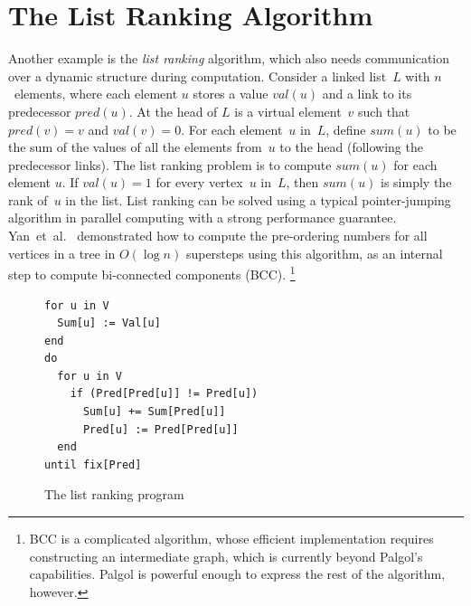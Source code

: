 \documentclass{sokendai_thesis} %
\begin{document}
\section{The List Ranking Algorithm}
\label{sec:list-ranking}

Another example is the \emph{list ranking} algorithm, which also needs communication over a dynamic structure during computation.
Consider a linked list~$L$ with $n$~elements, where each element $u$ stores a value $\mathit{val}(u)$ and a link to its predecessor $\mathit{pred}(u)$.
At the head of $L$ is a virtual element~$v$ such that $\mathit{pred}(v)=v$ and $\mathit{val}(v)=0$.
For each element~$u$ in~$L$, define $\mathit{sum}(u)$ to be the sum of the values of all the elements from~$u$ to the head (following the predecessor links).
The list ranking problem is to compute $\mathit{sum}(u)$ for each element $u$.
If $\mathit{val}(u)=1$ for every vertex~$u$ in~$L$, then $\mathit{sum}(u)$ is simply the rank of~$u$ in the list.
List ranking can be solved using a typical pointer-jumping algorithm in parallel computing with a strong performance guarantee.
Yan~et~al.~\cite{connectivity} demonstrated how to compute the pre-ordering numbers for all vertices in a tree in $O(\log n)$ supersteps using this algorithm, as an internal step to compute bi-connected components (BCC).%
\footnote{BCC is a complicated algorithm, whose efficient implementation requires constructing an intermediate graph, which is currently beyond Palgol's capabilities. Palgol is powerful enough to express the rest of the algorithm, however.}

\begin{figure}[t]
\begin{lstlisting}[basicstyle=\small\ttfamily]
for u in V
  Sum[u] := Val[u]
end
do
  for u in V
    if (Pred[Pred[u]] != Pred[u])
      Sum[u] += Sum[Pred[u]]
      Pred[u] := Pred[Pred[u]]
  end 
until fix[Pred]
\end{lstlisting}
\vspace{-2ex}
\caption{The list ranking program}
\label{fig:ranking-code}
\end{figure}
\end{document}
